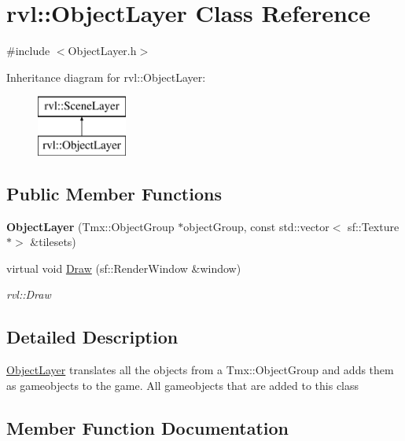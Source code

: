 \hypertarget{classrvl_1_1_object_layer}{}\section{rvl\+:\+:Object\+Layer Class Reference}
\label{classrvl_1_1_object_layer}


{\ttfamily \#include $<$Object\+Layer.\+h$>$}

Inheritance diagram for rvl\+:\+:Object\+Layer\+:\begin{figure}[H]
\begin{center}
\leavevmode
\includegraphics[height=2.000000cm]{classrvl_1_1_object_layer}
\end{center}
\end{figure}
\subsection*{Public Member Functions}
\begin{DoxyCompactItemize}
\item 
\mbox{\label{classrvl_1_1_object_layer_a6d05cb33022f41cf32d866d6857bade5}} 
{\bfseries Object\+Layer} (Tmx\+::\+Object\+Group $\ast$object\+Group, const std\+::vector$<$ sf\+::\+Texture $\ast$$>$ \&tilesets)
\item 
virtual void \hyperlink{classrvl_1_1_object_layer_a3b29bd63ae4233eba84817bfe9eecae9}{Draw} (sf\+::\+Render\+Window \&window)
\begin{DoxyCompactList}\small\item\em rvl\+::\+Draw \end{DoxyCompactList}\end{DoxyCompactItemize}


\subsection{Detailed Description}
\hyperlink{classrvl_1_1_object_layer}{Object\+Layer} translates all the objects from a Tmx\+::\+Object\+Group and adds them as gameobjects to the game. All gameobjects that are added to this class 

\subsection{Member Function Documentation}
\mbox{\label{classrvl_1_1_object_layer_a3b29bd63ae4233eba84817bfe9eecae9}} 
